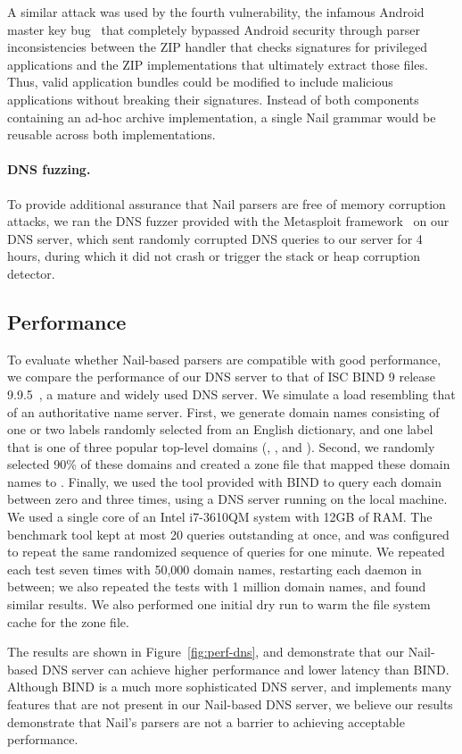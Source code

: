 A similar attack was used by the fourth vulnerability, the infamous
Android master key bug~\cite{saurik-masterkey} that completely
bypassed Android security through parser inconsistencies between the
ZIP handler that checks signatures for privileged applications and the
ZIP implementations that ultimately extract those files. Thus, valid
application bundles could be modified to include malicious applications
without breaking their signatures. Instead of both components containing
an ad-hoc archive implementation, a single Nail grammar would be reusable
across both implementations.

\paragraph{DNS fuzzing.}

To provide additional assurance that Nail parsers are free of memory
corruption attacks, we ran the DNS fuzzer provided with the Metasploit
framework~\cite{mspframework} on our DNS server, which sent randomly
corrupted DNS queries to our server for 4 hours, during which it did
not crash or trigger the stack or heap corruption detector.


\subsection{Performance}

To evaluate whether Nail-based parsers are compatible with good
performance, we compare the performance of our DNS server to that of ISC
BIND 9 release 9.9.5~\cite{bind9}, a mature and widely used DNS server.
We simulate a load resembling that of an authoritative name server.
First, we generate domain names consisting of one or two labels randomly
selected from an English dictionary, and one label that is one of
three popular top-level domains (, , and ).
Second, we randomly selected 90\% of these domains and created a zone
file that mapped these domain names to .  Finally, we used
the  tool provided with BIND to query each domain between
zero and three times, using a DNS server running on the local machine.
We used a single core of an Intel i7-3610QM system with 12GB of RAM.
The benchmark tool kept at most 20 queries outstanding at once, and
was configured to repeat the same randomized sequence of queries for
one minute.  We repeated each test seven times with 50,000 domain names,
restarting each daemon in between; we also repeated the tests with 1
million domain names, and found similar results.  We also performed one
initial dry run to warm the file system cache for the zone file.

The results are shown in Figure~\ref{fig:perf-dns}, and demonstrate that
our Nail-based DNS server can achieve higher performance and lower latency
than BIND\@.  Although BIND is a much more sophisticated DNS server,
and implements many features that are not present in our Nail-based DNS
server, we believe our results demonstrate that Nail's parsers are not
a barrier to achieving acceptable performance.



